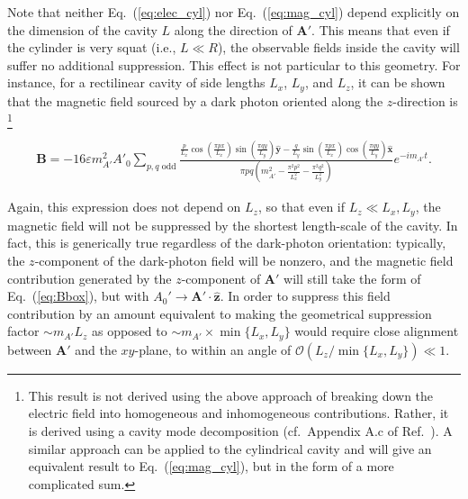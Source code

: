 \documentclass[amsmath,amssymb,aps,10pt,prd,letterpaper,nofootinbib,balancelastpage,notitlepage,superscriptaddress,twocolumn,floatfix]{revtex4-2}
\renewcommand{\eqref}[2][]{Eq{#1}.~(\ref{eq:#2})}	%
\newcommand{\citeR}[2][]{Ref{#1}.~\cite{#2}}		%
\newcommand{\xhat}{\bm{\hat{x}}}
\newcommand{\yhat}{\bm{\hat{y}}}
\begin{document}
Note that neither \eqref{elec_cyl} nor \eqref{mag_cyl} depend explicitly on the dimension of the cavity $L$ along the direction of $\bm{A}'$.
This means that even if the cylinder is very squat (i.e., $L\ll R$), the observable fields inside the cavity will suffer no additional suppression.
This effect is not particular to this geometry.
For instance, for a rectilinear cavity of side lengths $L_x$, $L_y$, and $L_z$, it can be shown that the magnetic field sourced by a dark photon oriented along the $z$-direction is%
\footnote{\label{ftnt:rectilinear}%
        This result is not derived using the above approach of breaking down the electric field into homogeneous and inhomogeneous contributions.
        Rather, it is derived using a cavity mode decomposition (cf.~Appendix A.c of \citeR{Chaudhuri:2014dla}).
        A similar approach can be applied to the cylindrical cavity and will give an equivalent result to \eqref{mag_cyl}, but in the form of a more complicated sum.
} %
\begin{widetext}
\begin{align}
    \bm{B}=-16\varepsilon m_{A'}^2A'_0\sum_{p,q\text{ odd}}\frac{\frac p{L_x}\cos\left(\frac{\pi px}{L_x}\right)\sin\left(\frac{\pi qy}{L_y}\right)\yhat-\frac q{L_y}\sin\left(\frac{\pi px}{L_x}\right)\cos\left(\frac{\pi qy}{L_y}\right)\xhat}{\pi pq\left(m_{A'}^2-\frac{\pi^2p^2}{L_x^2}-\frac{\pi^2q^2}{L_y^2}\right)}e^{-im_{A'}t}.
    \label{eq:Bbox}
\end{align}
\end{widetext}
Again, this expression does not depend on $L_z$, so that even if $L_z\ll L_x,L_y$, the magnetic field will not be suppressed by the shortest length-scale of the cavity.
In fact, this is generically true regardless of the dark-photon orientation: typically, the $z$-component of the dark-photon field will be nonzero, and the magnetic field contribution generated by the $z$-component of $\bm{A}'$ will still take the form of \eqref{Bbox}, but with $A_0' \rightarrow \bm{A}'\cdot\bm{\hat{z}}$.
In order to suppress this field contribution by an amount equivalent to making the geometrical suppression factor $\sim m_{A'}L_z$ as opposed to $\sim m_{A'}\times\min\{L_x,L_y\}$ would require close alignment between $\bm{A}'$ and the $xy$-plane, to within an angle of $\mathcal{O}( L_z / \min\{L_x,L_y\}) \ll 1$.

\end{document}
